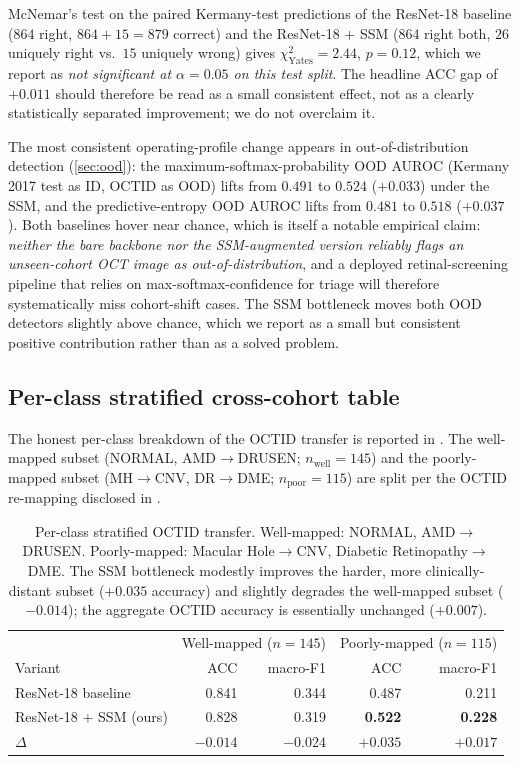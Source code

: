 \documentclass[5p]{elsarticle}
\begin{document}
McNemar's test on the paired Kermany-test predictions of the ResNet-18 baseline ($864$ right, $864 + 15 = 879$ correct) and the ResNet-18 + SSM ($864$ right both, $26$ uniquely right vs.\ $15$ uniquely wrong) gives $\chi^2_{\text{Yates}} = 2.44$, $p = 0.12$, which we report as \emph{not significant at $\alpha = 0.05$ on this test split}. The headline ACC gap of $+0.011$ should therefore be read as a small consistent effect, not as a clearly statistically separated improvement; we do not overclaim it.

The most consistent operating-profile change appears in out-of-distribution detection (\cref{sec:ood}): the maximum-softmax-probability OOD AUROC (Kermany 2017 test as ID, OCTID as OOD) lifts from $0.491$ to $0.524$ ($+0.033$) under the SSM, and the predictive-entropy OOD AUROC lifts from $0.481$ to $0.518$ ($+0.037$). Both baselines hover near chance, which is itself a notable empirical claim: \emph{neither the bare backbone nor the SSM-augmented version reliably flags an unseen-cohort OCT image as out-of-distribution}, and a deployed retinal-screening pipeline that relies on max-softmax-confidence for triage will therefore systematically miss cohort-shift cases. The SSM bottleneck moves both OOD detectors slightly above chance, which we report as a small but consistent positive contribution rather than as a solved problem.

\subsection{Per-class stratified cross-cohort table}
The honest per-class breakdown of the OCTID transfer is reported in . The well-mapped subset (NORMAL, AMD$\rightarrow$DRUSEN; $n_{\text{well}}=145$) and the poorly-mapped subset (MH$\rightarrow$CNV, DR$\rightarrow$DME; $n_{\text{poor}}=115$) are split per the OCTID re-mapping disclosed in .

\begin{table}[t]
\centering\small
\caption{Per-class stratified OCTID transfer. Well-mapped: NORMAL, AMD$\rightarrow$DRUSEN. Poorly-mapped: Macular Hole$\rightarrow$CNV, Diabetic Retinopathy$\rightarrow$DME. The SSM bottleneck modestly improves the harder, more clinically-distant subset ($+0.035$ accuracy) and slightly degrades the well-mapped subset ($-0.014$); the aggregate OCTID accuracy is essentially unchanged ($+0.007$).}
\label{tab:stratified}
\setlength{\tabcolsep}{4pt}
\begin{tabular}{l rr rr}
\toprule
 & \multicolumn{2}{c}{Well-mapped ($n=145$)} & \multicolumn{2}{c}{Poorly-mapped ($n=115$)} \\
Variant & ACC & macro-F1 & ACC & macro-F1 \\
\midrule
ResNet-18 baseline       & 0.841 & 0.344 & 0.487 & 0.211 \\
ResNet-18 + SSM (ours)   & 0.828 & 0.319 & \textbf{0.522} & \textbf{0.228} \\
$\Delta$                 & $-0.014$ & $-0.024$ & $\mathbf{+0.035}$ & $\mathbf{+0.017}$ \\
\bottomrule
\end{tabular}
\end{table}
\end{document}
